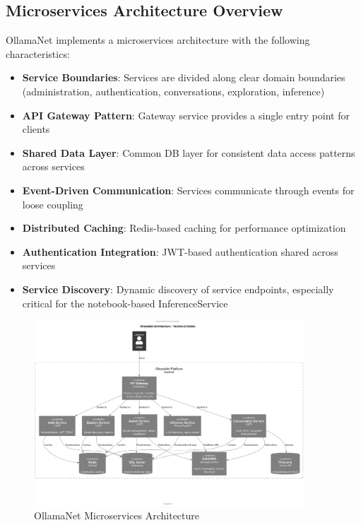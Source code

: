 \subsection{Microservices Architecture Overview}

OllamaNet implements a microservices architecture with the following characteristics:

\begin{itemize}
    \item \textbf{Service Boundaries}: Services are divided along clear domain boundaries (administration, authentication, conversations, exploration, inference)
    \item \textbf{API Gateway Pattern}: Gateway service provides a single entry point for clients
    \item \textbf{Shared Data Layer}: Common DB layer for consistent data access patterns across services
    \item \textbf{Event-Driven Communication}: Services communicate through events for loose coupling
    \item \textbf{Distributed Caching}: Redis-based caching for performance optimization
    \item \textbf{Authentication Integration}: JWT-based authentication shared across services
    \item \textbf{Service Discovery}: Dynamic discovery of service endpoints, especially critical for the notebook-based InferenceService
\end{itemize}

\begin{figure}
    \centering
    \includegraphics[width=0.9\textwidth]{./Chapter02/figures/OllamaNet_Architecture_Details.png}
    \caption{OllamaNet Microservices Architecture}
    \label{fig:ollamanet-arch-details}
\end{figure}

